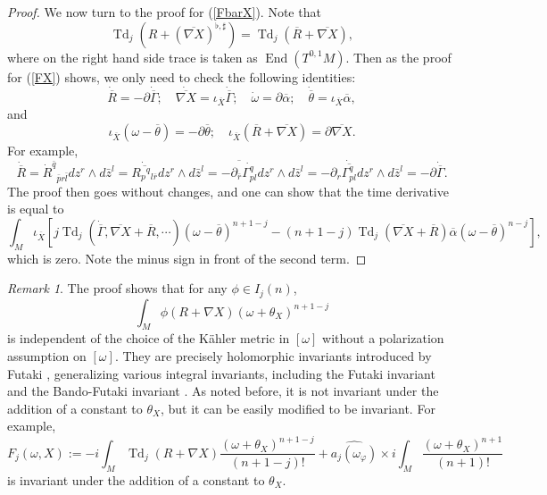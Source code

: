 \documentclass[12pt,reqno,a4paper]{amsart}
\numberwithin{equation}{section}
\def\bl{\bar l}
\def\br{\bar r}
\def\p{\partial}
\def\a{\alpha}
\DeclareMathOperator{\Td}{Td}
\DeclareMathOperator{\End}{End}
\theoremstyle{remark}
\newtheorem{remark}{Remark}
\theoremstyle{dotless}
\begin{document}
\begin{proof}
We now turn to the proof for (\ref{FbarX}). Note that 
\begin{equation*}
\Td_j(R+(\overline{\nabla X})^{\flat,\sharp})=\Td_j(\overline{R}+\overline{\nabla X}),
\end{equation*}
where on the right hand side trace is taken as $\End(T^{0,1}M)$.
Then as the proof for (\ref{FX}) shows, we only need to check the following identities:
\begin{equation*}
\dot{\overline{R}}=-\p \dot{\overline{\Gamma}};\quad \dot{\overline{\nabla X}}=\iota_{\overline{X}} \dot{\overline{\Gamma}};\quad \dot{\omega}=\p \overline{\alpha};\quad \dot{\overline{\theta}}=\iota_{\overline{X}}\overline{\alpha},
\end{equation*}
and
\begin{equation*}
\iota_{\overline{X}} (\omega-\overline{\theta})= -\p\overline{\theta};\quad 
\iota_{\overline{X}} (\overline{R}+\overline{\nabla X})=\p \overline{\nabla X}.
\end{equation*}
For example,
\begin{equation*}
\dot{\overline{R}}=\dot{R}^{\bar{q}}{}_{\bar{p}r\bl}dz^r\wedge d\bar{z}^l=\dot{\overline{R_{p}{}^{q}{}_{l \overline{r} } }}dz^r\wedge d\bar{z}^l=\overline{ -\p_{\br} \dot{\Gamma^{q}_{pl}}}dz^r\wedge d\bar{z}^l=-\p_r \dot{\overline{\Gamma^{q}_{pl}}}dz^r\wedge d\bar{z}^l=-\p\dot{\overline{\Gamma}}.
\end{equation*}
The proof then goes without changes, and one can show that the time derivative is equal to 
\begin{equation*}
\int_M \iota_{\overline{X}} \left[j\Td_j(\dot{\overline{\Gamma}},\overline{\nabla X}+\overline{R},\cdots)(\omega-\overline{\theta})^{n+1-j}-(n+1-j)\Td_j(\overline{\nabla X}+\overline{R})\overline{\a}(\omega-\overline{\theta})^{n-j} \right],
\end{equation*}
which is zero. Note the minus sign in front of the second term.
\end{proof}

\begin{remark}
The proof shows that for any $\phi\in I_j(n)$,
\begin{equation*}
\int_M \phi(R+\nabla X)(\omega+\theta_X)^{n+1-j}
\end{equation*}
is independent of the choice of the K\"ahler metric in $[\omega]$ without a polarization assumption on $[\omega]$. They are precisely holomorphic invariants introduced by Futaki \cite{futaki2004asymptotic}, generalizing various integral invariants, including the Futaki invariant \cite{futaki1983compact} and the Bando-Futaki invariant \cite{bando2006obstruction}. As noted before, it is not invariant under the addition of a constant to $\theta_X$, but it can be easily modified to be invariant. For example,
\begin{equation*}
F_j(\omega,X):=-i\int_M \Td_j(R+\nabla X)\frac{(\omega+\theta_X)^{n+1-j}}{(n+1-j)!}+\widehat{a_j(\omega_\varphi)}\times i\int_M\frac{(\omega+\theta_X)^{n+1}}{(n
+1)!}
\end{equation*}
is invariant under the addition of a constant to $\theta_X$.
\end{remark}
\end{document}
